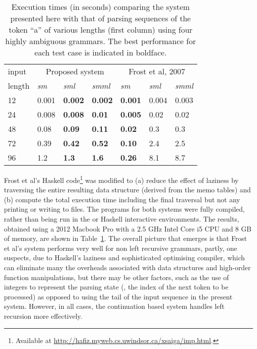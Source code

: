 \begin{table}
	\begin{center}
		\begin{tabular}{l|lll|lll}
			input & \multicolumn{3}{c|}{Proposed system} & \multicolumn{3}{c}{Frost et al, 2007} \\
			length & \textit{sm} & \textit{sml} & \textit{smml} &  \textit{sm} & \textit{sml} & \textit{smml} \\[0.1em]
			\hline 
			12 & 0.001 & \textbf{0.002} & \textbf{0.002} &  \textbf{0.001} & 0.004 & 0.003 \\
			24 & 0.008 & \textbf{0.008} & \textbf{0.01}    &  \textbf{0.005} & 0.02 & 0.02 \\
			48 & 0.08 & \textbf{0.09} & \textbf{0.11}    &  \textbf{0.02} & 0.3 & 0.3 \\
			72 & 0.39 & \textbf{0.42} & \textbf{0.52}    &  \textbf{0.10} & 2.4 & 2.5 \\
			96 & 1.2 & \textbf{1.3} & \textbf{1.6}       &  \textbf{0.26} & 8.1 & 8.7 \\
		\end{tabular}
	\end{center}
	\caption{Execution times (in seconds) comparing the system presented here with that of \citet{FrostHafizCallaghan2007}
parsing sequences of the token ``a'' of various lengths (first column) using four highly ambiguous grammars. The
best performance for each test case is indicated in boldface.}
	\label{tab:timings}
\end{table}

Frost et al's Haskell code\footnote{Available at \url{http://hafiz.myweb.cs.uwindsor.ca/xsaiga/imp.html}.}
was modified to (a) reduce the effect of laziness by traversing the entire resulting data
structure (derived from the memo tables) and (b) compute the total execution time
including the final traversal but not any printing or writing to files.
The programs for both systems were fully compiled, rather than being run in the
\OCaml or Haskell interactive environments. The results, obtained using
a 2012 Macbook Pro with a 2.5 GHz Intel Core i5 CPU and 8 GB of memory, are shown
in Table~\ref{tab:timings}. The overall picture that emerges is that Frost et al's system
performs very well for non left recursive grammars, partly, one suspects, due to Haskell's laziness and
sophisticated optimising compiler, which can eliminate many the overheads associated with
data structures and high-order function manipulations, but there may be other factors,
such as the use of integers to represent the parsing state (\ie, the index of the next token to
be processed) as opposed to using the tail of the input sequence in the present system.
However, in all cases, the continuation based system handles 
left recursion more effectively.

